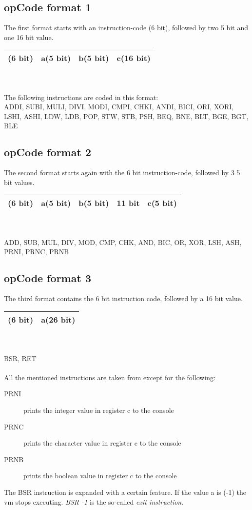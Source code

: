 \subsection{opCode format 1}
The first format starts with an instruction-code (6 bit), followed by two 5 bit
and one 16 bit value. \\
\begin{tabular}{| p{1.5cm} | p{1.25cm} | p{1.25cm} | p{4cm} |}
			\hline
			(6 bit) & a(5 bit) & b(5 bit) & c(16 bit) \\ 
			\hline  
\end{tabular}
\\ \\
The following instructions are coded in this format: \\
ADDI, SUBI, MULI, DIVI, MODI, CMPI, CHKI, ANDI, BICI, ORI, XORI,
LSHI, ASHI, LDW, LDB, POP, STW, STB, PSH, BEQ, BNE, BLT, BGE, BGT, BLE
\\

\subsection{opCode format 2}

The second format starts again with the 6 bit instruction-code, followed by 3 5
bit values. \\
\begin{tabular}{| p{1.5cm} | p{1.25cm} | p{1.25cm} | p{2.75cm} | p{} |}
			\hline
			(6 bit) & a(5 bit) & b(5 bit) & 11 bit & c(5 bit) \\ 
			\hline  
\end{tabular}
\\ \\
ADD, SUB, MUL, DIV, MOD, CMP, CHK, AND, BIC, OR, XOR, LSH, ASH, PRNI, PRNC, PRNB

\subsection{opCode format 3}
The third format contains the 6 bit instruction code, followed by a 16 bit
value. \\
\begin{tabular}{| p{1.5cm} | p{6.5cm} |}
			\hline
			(6 bit) & a(26 bit) \\ 
			\hline  
\end{tabular}
\\ \\
BSR, RET
\\ \\
All the mentioned instructions are taken from %
except for the following:
\begin{description}
\item[PRNI] prints the integer value in register c to the console
\item[PRNC] prints the character value in register c to the console
\item[PRNB] prints the boolean value in register c to the console
\end{description}
The BSR instruction is expanded with a certain feature. If the value a is (-1)
the vm stops executing. \emph{BSR -1} is the so-called \emph{exit instruction}. 
